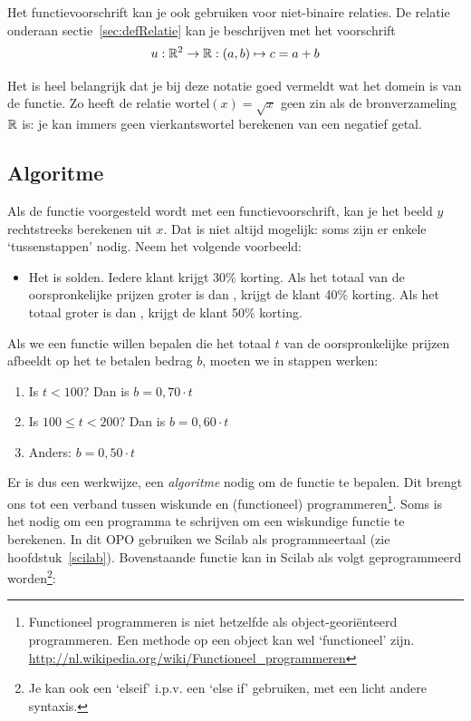 Het functievoorschrift kan je ook gebruiken voor niet-binaire relaties. De relatie onderaan sectie~\ref{sec:defRelatie} kan je beschrijven met het voorschrift
\[
u:\mathbb{R}^2\to\mathbb{R}:(a,b)\mapsto c =a+b
\]

Het is heel belangrijk dat je bij deze notatie goed vermeldt wat het domein is van de functie. Zo heeft de relatie $\text{wortel}(x)=\sqrt{x}$ geen zin als de bronverzameling $\mathbb{R}$ is: je kan immers geen vierkantswortel berekenen van een negatief getal.

\subsection{Algoritme}
Als de functie voorgesteld wordt met een functievoorschrift, kan je het beeld  $y$ rechtstreeks berekenen uit $x$. Dat is niet altijd mogelijk: soms zijn er enkele `tussenstappen' nodig. Neem het volgende voorbeeld:
\begin{itemize}
\item Het is solden. Iedere klant krijgt 30\% korting. Als het totaal van de oorspronkelijke prijzen groter is dan , krijgt de klant 40\% korting. Als het totaal groter is dan , krijgt de klant 50\% korting. 
\end{itemize}
Als we een functie willen bepalen die het totaal $t$ van de oorspronkelijke prijzen afbeeldt op het te betalen bedrag $b$, moeten we in stappen werken:
\begin{enumerate}
\item Is $t<100$? Dan is $b=0,70\cdot t$
\item Is $100\leqslant t<200$? Dan is $b=0,60\cdot t$
\item Anders: $b=0,50\cdot t$
\end{enumerate}

Er is dus een werkwijze, een \emph{algoritme} nodig om de functie te bepalen. Dit brengt ons tot een verband tussen wiskunde en (functioneel) programmeren\footnote{Functioneel programmeren is niet hetzelfde als object-geori\"enteerd programmeren. Een methode op een object kan wel `functioneel' zijn. \url{http://nl.wikipedia.org/wiki/Functioneel_programmeren}}. Soms is het nodig om een programma te schrijven om een wiskundige functie te berekenen. In dit OPO gebruiken we Scilab als programmeertaal (zie hoofdstuk~\ref{scilab}). Bovenstaande functie kan in Scilab als volgt geprogrammeerd worden\footnote{Je kan ook een ‘elseif’ i.p.v. een ‘else if’ gebruiken, met een licht andere syntaxis.}:

